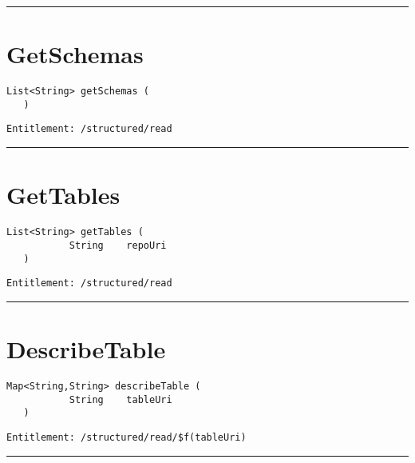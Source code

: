 \rule{12cm}{2pt}
\section{GetSchemas}
\label{Api:GetSchemas}
\begin{lstlisting}[style=nonumbers]
   List<String> getSchemas (
   )
\end{lstlisting}
\begin{Verbatim}[formatcom=\color{Maroon}]
  Entitlement: /structured/read
\end{Verbatim}



\rule{12cm}{2pt}
\section{GetTables}
\label{Api:GetTables}
\begin{lstlisting}[style=nonumbers]
   List<String> getTables (
           String    repoUri
   )
\end{lstlisting}
\begin{Verbatim}[formatcom=\color{Maroon}]
  Entitlement: /structured/read
\end{Verbatim}



\rule{12cm}{2pt}
\section{DescribeTable}
\label{Api:DescribeTable}
\begin{lstlisting}[style=nonumbers]
   Map<String,String> describeTable (
           String    tableUri
   )
\end{lstlisting}
\begin{Verbatim}[formatcom=\color{Maroon}]
  Entitlement: /structured/read/$f(tableUri)
\end{Verbatim}



\rule{12cm}{2pt}
